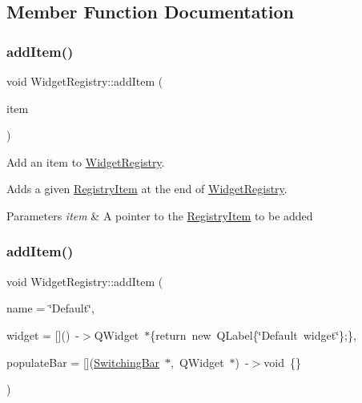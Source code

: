 \subsection{Member Function Documentation}
\hypertarget{class_widget_registry_a53de88d7a538a8a6bbbcca4328abb480}{}\label{class_widget_registry_a53de88d7a538a8a6bbbcca4328abb480} 
\subsubsection{\texorpdfstring{add\+Item()}{addItem()}\hspace{0.1cm}{\footnotesize\ttfamily [1/2]}}
{\footnotesize\ttfamily void Widget\+Registry\+::add\+Item (\begin{DoxyParamCaption}\item[{\hyperlink{class_registry_item}{Registry\+Item} $\ast$}]{item }\end{DoxyParamCaption})}



Add an item to \hyperlink{class_widget_registry}{Widget\+Registry}. 

Adds a given \hyperlink{class_registry_item}{Registry\+Item} at the end of \hyperlink{class_widget_registry}{Widget\+Registry}. 
\begin{DoxyParams}{Parameters}
{\em item} & A pointer to the \hyperlink{class_registry_item}{Registry\+Item} to be added \\
\hline
\end{DoxyParams}
\hypertarget{class_widget_registry_a545df9d9afbcfa625795cb7d2834aac5}{}\label{class_widget_registry_a545df9d9afbcfa625795cb7d2834aac5} 
\subsubsection{\texorpdfstring{add\+Item()}{addItem()}\hspace{0.1cm}{\footnotesize\ttfamily [2/2]}}
{\footnotesize\ttfamily void Widget\+Registry\+::add\+Item (\begin{DoxyParamCaption}\item[{Q\+String}]{name = {\ttfamily \char`\"{}Default\char`\"{}},  }\item[{Q\+Widget $\ast$($\ast$)()}]{widget = {\ttfamily \mbox{[}\mbox{]}()~-\/$>$QWidget~$\ast$\{return~new~QLabel\{\char`\"{}Default~widget\char`\"{}\};\}},  }\item[{void($\ast$)(\hyperlink{class_switching_bar}{Switching\+Bar} $\ast$, Q\+Widget $\ast$)}]{populate\+Bar = {\ttfamily \mbox{[}\mbox{]}(\hyperlink{class_switching_bar}{Switching\+Bar}~$\ast$,~QWidget~$\ast$)~-\/$>$void~\{\}} }\end{DoxyParamCaption})}



